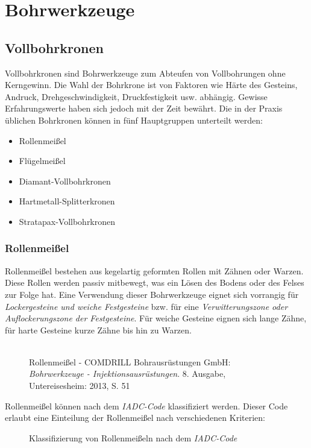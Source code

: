 \documentclass[12pt,a4paper,draft]{scrartcl} %
\begin{document}
\section{Bohrwerkzeuge}
\label{sec:bohrwerkzeuge}
\subsection{Vollbohrkronen}
\label{subsec:Vollbohrkronen}
Vollbohrkronen sind Bohrwerkzeuge zum Abteufen von Vollbohrungen ohne Kerngewinn. Die Wahl der Bohrkrone ist von Faktoren wie Härte des Gesteins, Andruck, Drehgeschwindigkeit, Druckfestigkeit usw. abhängig. Gewisse Erfahrungswerte haben sich jedoch mit der Zeit bewährt. Die in der Praxis üblichen Bohrkronen können in fünf Hauptgruppen unterteilt werden:
\begin{itemize}
\item Rollenmeißel
\item Flügelmeißel
\item Diamant-Vollbohrkronen
\item Hartmetall-Splitterkronen
\item Stratapax-Vollbohrkronen
\end{itemize}

\subsubsection{Rollenmeißel}
Rollenmeißel bestehen aus kegelartig geformten Rollen mit Zähnen oder Warzen. Diese Rollen werden passiv mitbewegt, was ein Lösen des Bodens oder des Felses zur Folge hat.
Eine Verwendung dieser Bohrwerkzeuge eignet sich vorrangig für \emph{Lockergesteine und weiche Festgesteine} bzw. für eine \emph{Verwitterungszone oder Auflockerungszone der Festgesteine}. Für weiche Gesteine eignen sich lange Zähne, für harte Gesteine kurze Zähne bis hin zu Warzen.\\\\

\begin{figure}[H]
\caption{Rollenmeißel - COMDRILL Bohrausrüstungen GmbH: \emph{Bohrwerkzeuge - Injektionsausrüstungen}. 8. Ausgabe, Untereisesheim: 2013, S. 51}
\end{figure}

\newpage
Rollenmeißel können nach dem \emph{IADC-Code} klassifiziert werden. Dieser Code erlaubt eine Einteilung der Rollenmeißel nach verschiedenen Kriterien:

\begin{figure}[H]
\caption{Klassifizierung von Rollenmeißeln nach dem \emph{IADC-Code}}
\end{figure}
\end{document}
